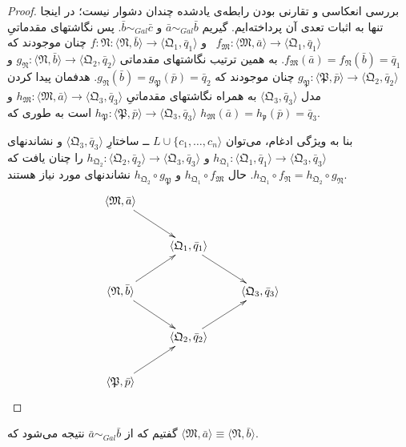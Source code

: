 \documentclass[12pt,a4paper]{article}
\theoremstyle{colorhead}
\begin{document}
\begin{proof}
بررسی
انعکاسی و تقارنی بودن رابطه‌ی یادشده چندان دشوار نیست؛ در اینجا تنها به اثبات تعدی آن پرداخته‌ایم. گیریم
$\bar{a}\sim_{Gal}\bar{b}$
و
$\bar{b}\sim_{Gal} \bar{c}$.
پس نگاشتهای مقدماتیِ
\mbox{$f_\mathfrak{M}:\langle \mathfrak{M},\bar{a}\rangle \to \langle \mathfrak{Q}_1,\bar{q}_1\rangle$ }
و
$f:\mathfrak{N}:\langle\mathfrak{N},\bar{b}\rangle\to\langle \mathfrak{Q}_1,\bar{q}_1\rangle$
چنان موجودند که 
\mbox{$f_\mathfrak{M}(\bar{a})=f_\mathfrak{N}(\bar{b})=\bar{q}_1$}.
به همین ترتیب نگاشتهای مقدماتی
$g_\mathfrak{N}:\langle \mathfrak{N},\bar{b}\rangle\to \langle \mathfrak{Q}_2,\bar{q}_2\rangle$
و
$g_\mathfrak{P}:\langle\mathfrak{P},\bar{p}\rangle \to \langle \mathfrak{Q}_2,\bar{q}_2\rangle$
چنان موجودند
که 
$g_\mathfrak{N}(\bar{b})=g_\mathfrak{P}(\bar{p})=\bar{q}_2$.
هدفمان پیدا کردن مدل
$\langle\mathfrak{Q}_3,\bar{q}_3\rangle$
به همراه نگاشتهای مقدماتیِ
$h_\mathfrak{M}:\langle \mathfrak{M},\bar{a}\rangle\to \langle \mathfrak{Q}_3,\bar{q}_3\rangle$
و 
$h_\mathfrak{P}:\langle \mathfrak{P},\bar{p}\rangle\to\langle \mathfrak{Q}_3,\bar{q}_3\rangle$
است به طوری که
$h_\mathfrak{M}(\bar{a})=h_\mathfrak{p}(\bar{p})=\bar{q}_3$.
\par 
بنا به ویژگی ادغام، می‌توان
$L\cup \{c_1,\ldots,c_n\rangle$
ــ‌
ساختارِ 
$\langle \mathfrak{Q}_3,\bar{q}_3\rangle$
و نشاندنهای 
\mbox{$h_{\mathfrak{Q}_1}:\langle \mathfrak{Q}_1,\bar{q}_1\rangle\to
\langle \mathfrak{Q}_3,\bar{q}_3\rangle$}
و
$h_{\mathfrak{Q}_2}:\langle \mathfrak{Q}_2,\bar{q}_2\rangle\to
\langle \mathfrak{Q}_3,\bar{q}_3\rangle$
را چنان یافت که
\mbox{$h_{\mathfrak{Q}_1}\circ f_\mathfrak{N}=h_{\mathfrak{Q}_2}\circ g_\mathfrak{N}$}.
حال
$h_{\mathfrak{Q}_1}\circ f_\mathfrak{M}$
و
$h_{\mathfrak{Q}_2}\circ g_\mathfrak{P}$
نشاندنهای مورد نیاز هستند.
\begin{displaymath}
    \xymatrix{
        \langle \mathfrak{M},\bar{a}\rangle \ar[dr] & &  & \\
                & \langle \mathfrak{Q}_1,\bar{q}_1\rangle \ar[dr] &  & \\
        \langle \mathfrak{N},\bar{b}\rangle  \ar[ur]\ar[dr]&  & \langle \mathfrak{Q}_3,\bar{q}_3\rangle &  \\
          & \langle \mathfrak{Q}_2,\bar{q}_2\rangle \ar[ur]& &  \\
        \langle \mathfrak{P},\bar{p}\rangle \ar[ur] &  &  &  
       }
\end{displaymath}
\end{proof}
گفتیم که
از
$\bar{a}\sim_{Gal}\bar{b}$
نتیجه می‌شود که
$\langle \mathfrak{M},\bar{a}\rangle\equiv\langle \mathfrak{N},\bar{b}\rangle$.
\end{document}
